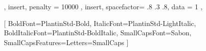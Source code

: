 \usepackage[french, main=latin]{babel}
\usepackage[utf8]{inputenc}
\usepackage[urw-decorativ]{mathdesign}
\usepackage[T1]{fontenc}
\usepackage{fontspec}
\usepackage{newunicodechar}

{ {},         %
	{ insert, penalty = 10000 },                 %
	{ insert, spacefactor= .8 .3 .8, data = 1 }, %
	{}          %
}

\newcommand{\frenchpar}[1]{\begin{otherlanguage*}{french}#1\end{otherlanguage*}}
\newcommand{\fbseries}{\unskip\setBold[0.1]\aftergroup\unsetBold\aftergroup\ignorespaces}

\setmainfont{PlantinStd-Light}[
	BoldFont=PlantinStd-Bold,
	ItalicFont=PlantinStd-LightItalic,
	BoldItalicFont=PlantinStd-BoldItalic,
	SmallCapsFont=Sabon,
	SmallCapsFeatures={Letters=SmallCaps}
]

\newfontfamily{}
\newfontfamily{}

\fontsize{11.5pt}{5mm}\selectfont

\newdimen{\gregoLineDepth}
\gregoLineDepth=2mm

\makeatletter
\renewcommand{\strut}[1][.3\baselineskip]{%
    \hbox{%
        \vrule\@height\z@%
        \@depth#1%
        \@width\z@%
    }%
}
\makeatother
